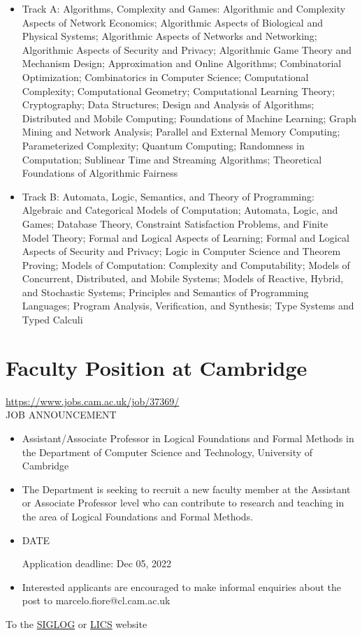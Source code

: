 \documentclass[prodmode,acmtecs]{acmsmall} %
\begin{document}
\begin{itemize}
\begin{itemize}\item  Track A: Algorithms, Complexity and Games: Algorithmic and Complexity Aspects of Network Economics; Algorithmic Aspects of Biological and Physical Systems; Algorithmic Aspects of Networks and Networking; Algorithmic Aspects of Security and Privacy; Algorithmic Game Theory and Mechanism Design; Approximation and Online Algorithms; Combinatorial Optimization; Combinatorics in Computer Science; Computational Complexity; Computational Geometry; Computational Learning Theory; Cryptography; Data Structures; Design and Analysis of Algorithms; Distributed and Mobile Computing; Foundations of Machine Learning; Graph Mining and Network Analysis; Parallel and External Memory Computing; Parameterized Complexity; Quantum Computing; Randomness in Computation; Sublinear Time and Streaming Algorithms; Theoretical Foundations of Algorithmic Fairness
\item  Track B: Automata, Logic, Semantics, and Theory of Programming: Algebraic and Categorical Models of Computation; Automata, Logic, and Games; Database Theory, Constraint Satisfaction Problems, and Finite Model Theory; Formal and Logical Aspects of Learning; Formal and Logical Aspects of Security and Privacy; Logic in Computer Science and Theorem Proving; Models of Computation: Complexity and Computability; Models of Concurrent, Distributed, and Mobile Systems; Models of Reactive, Hybrid, and Stochastic Systems; Principles and Semantics of Programming Languages; Program Analysis, Verification, and Synthesis; Type Systems and Typed Calculi
\end{itemize} 
\end{itemize}\section{Faculty Position at Cambridge}\label{FacultyPositionatCambridge}  \href{https://www.jobs.cam.ac.uk/job/37369/}{https://www.jobs.cam.ac.uk/job/37369/}\\ 
JOB ANNOUNCEMENT 

\begin{itemize}\item  Assistant/Associate Professor in Logical Foundations and Formal Methods in the Department of Computer Science and Technology, University of Cambridge 
 
\item  The Department is seeking to recruit a new faculty member at the Assistant or Associate Professor level who can contribute to research and teaching in the area of Logical Foundations and Formal Methods. 
 
\item  DATE 
 
Application deadline: Dec 05, 2022 
 
\item  Interested applicants are encouraged to make informal enquiries about the post to marcelo.fiore@cl.cam.ac.uk 
 
\end{itemize}


To the \href{http://siglog.org/}{SIGLOG} or \href{https://lics.siglog.org}{LICS} website
\end{document}
